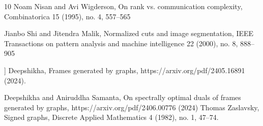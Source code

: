 \documentclass[final,1p,times]{elsarticle}
\begin{document}
\begin{thebibliography}{10}
 Noam Nisan and Avi Wigderson, On rank vs. communication complexity, Combinatorica 15 (1995), no. 4, 557–565

 Jianbo Shi and Jitendra Malik, Normalized cuts and image segmentation, IEEE Transactions on pattern analysis and machine intelligence 22 (2000), no. 8, 888–905


 ] Deepshikha, Frames generated by graphs, https://arxiv.org/pdf/2405.16891 (2024).

Deepshikha and Aniruddha Samanta, On spectrally optimal duals of frames generated by graphs,
https://arxiv.org/pdf/2406.00776 (2024)
Thomas Zaslavsky, Signed graphs, Discrete Applied Mathematics 4 (1982), no. 1, 47–74.

\end{thebibliography}
	
\end{document}
